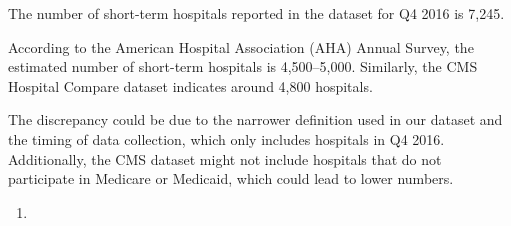 \documentclass[
  letterpaper,
  DIV=11,
  numbers=noendperiod]{scrartcl}
\providecommand{\tightlist}{%
  \setlength{\itemsep}{0pt}\setlength{\parskip}{0pt}}\usepackage{longtable,booktabs,array}
\begin{document}
The number of short-term hospitals reported in the dataset for Q4 2016
is 7,245.

According to the American Hospital Association (AHA) Annual Survey, the
estimated number of short-term hospitals is 4,500--5,000. Similarly, the
CMS Hospital Compare dataset indicates around 4,800 hospitals.

The discrepancy could be due to the narrower definition used in our
dataset and the timing of data collection, which only includes hospitals
in Q4 2016. Additionally, the CMS dataset might not include hospitals
that do not participate in Medicare or Medicaid, which could lead to
lower numbers.

\begin{enumerate}
\def\labelenumi{\arabic{enumi}.}
\setcounter{enumi}{2}
\tightlist
\item
\end{enumerate}
\end{document}
